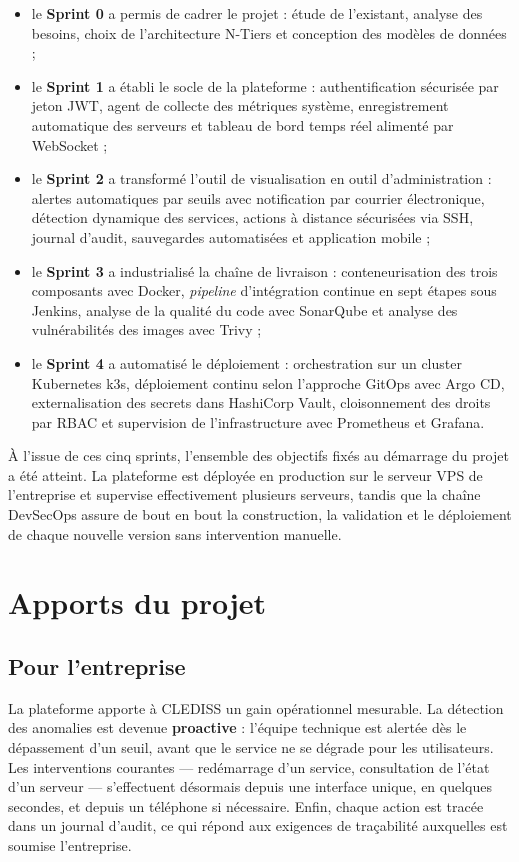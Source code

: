 \begin{itemize}[label=]
  \item le \textbf{Sprint 0} a permis de cadrer le projet : étude de l'existant, analyse
        des besoins, choix de l'architecture N-Tiers et conception des modèles de
        données ;
  \item le \textbf{Sprint 1} a établi le socle de la plateforme : authentification
        sécurisée par jeton JWT, agent de collecte des métriques système, enregistrement
        automatique des serveurs et tableau de bord temps réel alimenté par WebSocket ;
  \item le \textbf{Sprint 2} a transformé l'outil de visualisation en outil
        d'administration : alertes automatiques par seuils avec notification par courrier
        électronique, détection dynamique des services, actions à distance sécurisées via
        SSH, journal d'audit, sauvegardes automatisées et application mobile ;
  \item le \textbf{Sprint 3} a industrialisé la chaîne de livraison : conteneurisation
        des trois composants avec Docker, \textit{pipeline} d'intégration continue en
        sept étapes sous Jenkins, analyse de la qualité du code avec SonarQube et analyse
        des vulnérabilités des images avec Trivy ;
  \item le \textbf{Sprint 4} a automatisé le déploiement : orchestration sur un cluster
        Kubernetes k3s, déploiement continu selon l'approche GitOps avec Argo CD,
        externalisation des secrets dans HashiCorp Vault, cloisonnement des droits par
        RBAC et supervision de l'infrastructure avec Prometheus et Grafana.
\end{itemize}

À l'issue de ces cinq sprints, l'ensemble des objectifs fixés au démarrage du projet a
été atteint. La plateforme est déployée en production sur le serveur VPS de l'entreprise
et supervise effectivement plusieurs serveurs, tandis que la chaîne DevSecOps assure de
bout en bout la construction, la validation et le déploiement de chaque nouvelle version
sans intervention manuelle.

\section*{Apports du projet}

\subsection*{Pour l'entreprise}
La plateforme apporte à CLEDISS un gain opérationnel mesurable. La détection des
anomalies est devenue \textbf{proactive} : l'équipe technique est alertée dès le
dépassement d'un seuil, avant que le service ne se dégrade pour les utilisateurs. Les
interventions courantes — redémarrage d'un service, consultation de l'état d'un serveur —
s'effectuent désormais depuis une interface unique, en quelques secondes, et depuis un
téléphone si nécessaire. Enfin, chaque action est tracée dans un journal d'audit, ce qui
répond aux exigences de traçabilité auxquelles est soumise l'entreprise.

